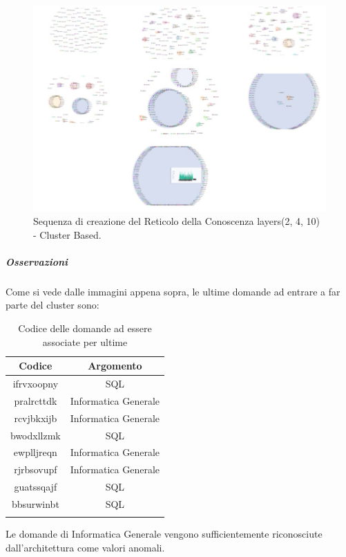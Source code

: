 \begin{figure}[H]
\centering
	\includegraphics[width=0.70\linewidth]{./image/collage_reticolo-sql(2,4,10).png}
	\caption{Sequenza di creazione del Reticolo della Conoscenza layers(2, 4, 10) - Cluster Based.}
	\label{Sequenza di creazione del Reticolo della Conoscenza layers(2, 4, 10) - Cluster Based.}
\end{figure}
\noindent
\subparagraph{Osservazioni}\mbox{}
\noindent
Come si vede dalle immagini appena sopra, le ultime domande ad entrare a far parte del cluster sono:

\begin{longtable}{|c|c|}
	\hline
	\textbf{Codice} & \textbf{Argomento} \\\hline\hline
	ifrvxoopny & SQL \\
	pralrcttdk & Informatica Generale \\
	rcvjbkxijb & Informatica Generale \\
	bwodxllzmk & SQL \\
	ewplljreqn & Informatica Generale \\
	rjrbsovupf & Informatica Generale \\
	guatssqajf & SQL \\
	bbsurwinbt & SQL \\
\hline
	
\caption{Codice delle domande ad essere associate per ultime}\label{tab:codice delle domande ad essere associate per ultime}
\end{longtable}
\noindent
Le domande di Informatica Generale vengono sufficientemente riconosciute dall'architettura come valori anomali.

